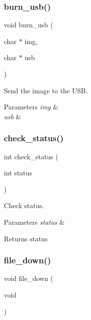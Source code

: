 \subsubsection{burn\+\_\+usb()}
{\footnotesize\ttfamily void burn\+\_\+usb (\begin{DoxyParamCaption}\item[{char $\ast$}]{img,  }\item[{char $\ast$}]{usb }\end{DoxyParamCaption})}



Send the image to the U\+SB. 


\begin{DoxyParams}{Parameters}
{\em img} & \\
\hline
{\em usb} & \\
\hline
\end{DoxyParams}
\mbox{\label{client_8c_af00002a7d3df82f54b2041a687797915}} 
\subsubsection{check\+\_\+status()}
{\footnotesize\ttfamily int check\+\_\+status (\begin{DoxyParamCaption}\item[{int}]{status }\end{DoxyParamCaption})}



Check status. 


\begin{DoxyParams}{Parameters}
{\em status} & \\
\hline
\end{DoxyParams}
\begin{DoxyReturn}{Returns}
status 
\end{DoxyReturn}
\mbox{\label{client_8c_ab03613f9e4af8de01a3ced4a764b7ffc}} 
\subsubsection{file\+\_\+down()}
{\footnotesize\ttfamily void file\+\_\+down (\begin{DoxyParamCaption}\item[{void}]{ }\end{DoxyParamCaption})}



